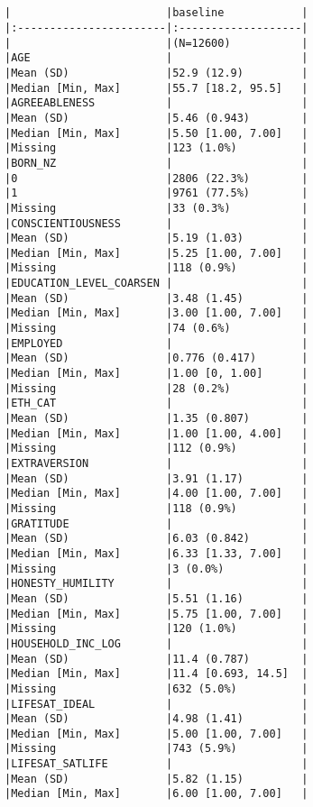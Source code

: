 \documentclass[
  singlecolumn]{report}
\begin{document}
\begin{verbatim}


|                        |baseline            |
|:-----------------------|:-------------------|
|                        |(N=12600)           |
|AGE                     |                    |
|Mean (SD)               |52.9 (12.9)         |
|Median [Min, Max]       |55.7 [18.2, 95.5]   |
|AGREEABLENESS           |                    |
|Mean (SD)               |5.46 (0.943)        |
|Median [Min, Max]       |5.50 [1.00, 7.00]   |
|Missing                 |123 (1.0%)          |
|BORN_NZ                 |                    |
|0                       |2806 (22.3%)        |
|1                       |9761 (77.5%)        |
|Missing                 |33 (0.3%)           |
|CONSCIENTIOUSNESS       |                    |
|Mean (SD)               |5.19 (1.03)         |
|Median [Min, Max]       |5.25 [1.00, 7.00]   |
|Missing                 |118 (0.9%)          |
|EDUCATION_LEVEL_COARSEN |                    |
|Mean (SD)               |3.48 (1.45)         |
|Median [Min, Max]       |3.00 [1.00, 7.00]   |
|Missing                 |74 (0.6%)           |
|EMPLOYED                |                    |
|Mean (SD)               |0.776 (0.417)       |
|Median [Min, Max]       |1.00 [0, 1.00]      |
|Missing                 |28 (0.2%)           |
|ETH_CAT                 |                    |
|Mean (SD)               |1.35 (0.807)        |
|Median [Min, Max]       |1.00 [1.00, 4.00]   |
|Missing                 |112 (0.9%)          |
|EXTRAVERSION            |                    |
|Mean (SD)               |3.91 (1.17)         |
|Median [Min, Max]       |4.00 [1.00, 7.00]   |
|Missing                 |118 (0.9%)          |
|GRATITUDE               |                    |
|Mean (SD)               |6.03 (0.842)        |
|Median [Min, Max]       |6.33 [1.33, 7.00]   |
|Missing                 |3 (0.0%)            |
|HONESTY_HUMILITY        |                    |
|Mean (SD)               |5.51 (1.16)         |
|Median [Min, Max]       |5.75 [1.00, 7.00]   |
|Missing                 |120 (1.0%)          |
|HOUSEHOLD_INC_LOG       |                    |
|Mean (SD)               |11.4 (0.787)        |
|Median [Min, Max]       |11.4 [0.693, 14.5]  |
|Missing                 |632 (5.0%)          |
|LIFESAT_IDEAL           |                    |
|Mean (SD)               |4.98 (1.41)         |
|Median [Min, Max]       |5.00 [1.00, 7.00]   |
|Missing                 |743 (5.9%)          |
|LIFESAT_SATLIFE         |                    |
|Mean (SD)               |5.82 (1.15)         |
|Median [Min, Max]       |6.00 [1.00, 7.00]   |

\end{verbatim}
\end{document}
